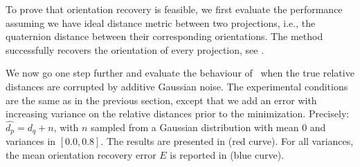 
To prove that orientation recovery is feasible, we first evaluate the performance assuming we have ideal distance metric between two projections, i.e., the quaternion distance between their corresponding orientations.
The method successfully recovers the orientation of every projection, see .

We now go one step further and evaluate the behaviour of~ when the true relative distances are corrupted by additive Gaussian noise.
The experimental conditions are the same as in the previous section, except that we add an error with increasing variance on the relative distances prior to the minimization.
Precisely: $\widehat{d_p} = d_q + n$, with $n$ sampled from a Gaussian distribution with mean 0 and variances in $[0.0, 0.8]$.
The results are presented in  (red curve).
For all variances, the mean orientation recovery error $E$ is reported in  (blue curve).

